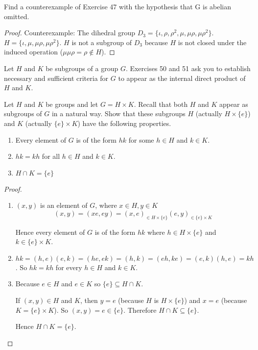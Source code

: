 \begin{exercise}
    Find a counterexample of Exercise 47 with the hypothesis that G is abelian omitted.
\end{exercise}

\begin{proof}
    Counterexample: The dihedral group $D_{3} = \{ \iota, \rho, \rho^{2}, \mu, \mu\rho, \mu\rho^{2} \}$. $H = \{ \iota, \mu, \mu\rho, \mu\rho^{2} \}$. $H$ is not a subgroup of $D_{3}$ because $H$ is not closed under the induced operation ($\mu\mu\rho = \rho \notin H$).
\end{proof}

Let $H$ and $K$ be subgroups of a group $G$. Exercises 50 and 51 ask you to establish necessary and sufficient criteria for $G$ to appear as the internal direct product of $H$ and $K$.

\begin{exercise}
    Let $H$ and $K$ be groups and let $G = H \times K$. Recall that both $H$ and $K$ appear as subgroups of $G$ in a natural way. Show that these subgroups $H$ (actually $H \times \{e\}$) and $K$ (actually $\{e\} \times K$) have the following properties.
    \begin{enumerate}[label={\textbf{\alph*.}}]
        \item Every element of $G$ is of the form $hk$ for some $h\in H$ and $k\in K$.
        \item $hk = kh$ for all $h\in H$ and $k\in K$.
        \item $H\cap K = \{ e \}$
    \end{enumerate}
\end{exercise}

\begin{proof}
    \begin{enumerate}[label={\textbf{\alph*.}}]
        \item $(x, y)$ is an element of $G$, where $x\in H, y\in K$
              \[
                  (x, y) = (xe, ey) = {(x, e)}_{\in H\times\{e\}}{(e, y)}_{\in\{e\}\times K}
              \]

              Hence every element of $G$ is of the form $hk$ where $h\in H\times\{e\}$ and $k\in\{e\}\times K$.
        \item $hk = (h,e)(e,k) = (he,ek) = (h,k) = (eh,ke) = (e,k)(h,e) = kh$. So $hk = kh$ for every $h\in H$ and $k\in K$.
        \item Because $e\in H$ and $e\in K$ so $\{e\} \subseteq H\cap K$.

              If $(x,y)\in H$ and $K$, then $y = e$ (because $H$ is $H\times\{e\}$) and $x = e$ (because $K = \{e\}\times K$). So $(x,y) = e\in \{e\}$. Therefore $H\cap K\subseteq \{e\}$.

              Hence $H\cap K = \{e\}$.
    \end{enumerate}
\end{proof}


